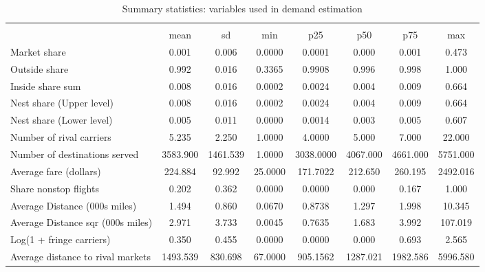 \begin{table}[htbp]\centering
\def\sym#1{\ifmmode^{#1}\else\(^{#1}\)\fi}
\caption{Summary statistics: variables used in demand estimation}
\begin{tabular}{l*{1}{ccccccc}}
\toprule
                    &\multicolumn{7}{c}{}                                                                      \\
                    &        mean&          sd&         min&         p25&         p50&         p75&         max\\
\midrule
Market share        &       0.001&       0.006&      0.0000&      0.0001&       0.000&       0.001&       0.473\\
Outside share       &       0.992&       0.016&      0.3365&      0.9908&       0.996&       0.998&       1.000\\
Inside share sum    &       0.008&       0.016&      0.0002&      0.0024&       0.004&       0.009&       0.664\\
Nest share (Upper level)&       0.008&       0.016&      0.0002&      0.0024&       0.004&       0.009&       0.664\\
Nest share (Lower level)&       0.005&       0.011&      0.0000&      0.0014&       0.003&       0.005&       0.607\\
Number of rival carriers&       5.235&       2.250&      1.0000&      4.0000&       5.000&       7.000&      22.000\\
Number of destinations served&    3583.900&    1461.539&      1.0000&   3038.0000&    4067.000&    4661.000&    5751.000\\
Average fare (dollars)&     224.884&      92.992&     25.0000&    171.7022&     212.650&     260.195&    2492.016\\
Share nonstop flights &       0.202&       0.362&      0.0000&      0.0000&       0.000&       0.167&       1.000\\
Average Distance (000s miles)&       1.494&       0.860&      0.0670&      0.8738&       1.297&       1.998&      10.345\\
Average Distance sqr (000s miles)&       2.971&       3.733&      0.0045&      0.7635&       1.683&       3.992&     107.019\\
Log(1 + fringe carriers)&       0.350&       0.455&      0.0000&      0.0000&       0.000&       0.693&       2.565\\
Average distance to rival markets&    1493.539&     830.698&     67.0000&    905.1562&    1287.021&    1982.586&    5996.580\\

\end{tabular}
\end{table}
